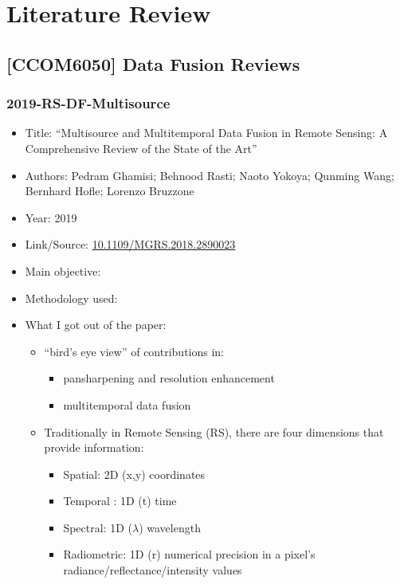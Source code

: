 \section{Literature Review}

\subsection{[CCOM6050] Data Fusion Reviews}

\subsubsection{2019-RS-DF-Multisource}
\begin{itemize}
    \item Title: ``Multisource and Multitemporal Data Fusion in Remote Sensing: A Comprehensive Review of the State of the Art''
    \item Authors: Pedram Ghamisi; Behnood Rasti; Naoto Yokoya; Qunming Wang; Bernhard Hofle; Lorenzo Bruzzone
    \item Year: 2019
    \item Link/Source: \href{https://doi.org/10.1109/MGRS.2018.2890023}{10.1109/MGRS.2018.2890023}
    \item Main objective:
    \item Methodology used:
    \item What I got out of the paper:
        \begin{itemize}
            \item “bird’s eye view” of contributions in:
                \begin{itemize}
                    \item pansharpening and resolution enhancement
                    \item multitemporal data fusion
                \end{itemize}
            \item Traditionally in Remote Sensing (RS), there are four dimensions that provide information:
                \begin{itemize}
                    \item Spatial: 2D (x,y) coordinates
                    \item Temporal : 1D (t) time
                    \item Spectral: 1D ($\lambda$) wavelength 
                    \item Radiometric: 1D (r) numerical precision in a pixel's radiance/reflectance/intensity values

\end{itemize}
\end{itemize}
\end{itemize}
